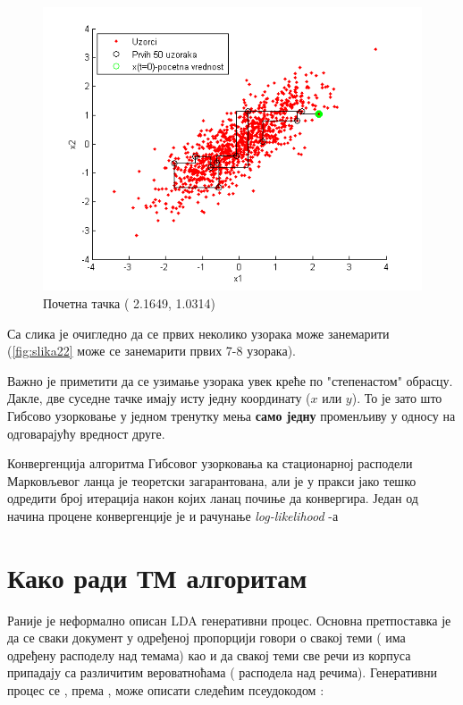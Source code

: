 \begin{figure}[H]
   \includegraphics[scale=0.4]{./Slike/slika24.png} 
  \caption{Почетна тачка ( 2.1649, 1.0314)}\label{fig:slika24}
\endminipage
\end{figure}

Са слика је очигледно да се првих неколико узорака може занемарити (\ref{fig:slika22} може се занемарити првих 7-8 узорака).

Важно је приметити да се узимање узорака увек креће по "степенастом" обрасцу. Дакле, две суседне тачке имају исту једну координату ($x$ или $y$). То је зато што  Гибсово узорковање у једном тренутку мења \textbf{само једну} променљиву у односу на одговарајућу вредност друге.

Конвергенција алгоритма Гибсовог узорковања ка стационарној расподели Марковљевог ланца је теоретски загарантована, али је у пракси јако тешко одредити број итерација након којих ланац почиње да конвергира. Један од начина процене конвергенције је и рачунање \textit{log-likelihood} -а

\section{Како ради ТМ алгоритам}

Раније је неформално описан  LDA генеративни процес. Основна претпоставка је да се сваки документ у одређеној пропорцији говори о свакој теми ( има одређену расподелу над темама) као и да свакој теми све речи из корпуса припадају са различитим вероватноћама ( расподела над речима).  Генеративни процес се , према \cite{verov9}, може описати следећим псеудокодом :

